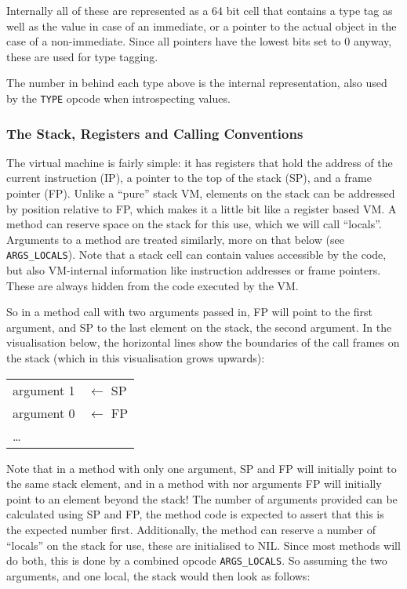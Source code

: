 \documentclass[12pt,a4paper]{article}
\begin{document}

Internally all of these are represented as a 64 bit cell that contains a type tag as well as the value in case of an immediate, or a pointer to the actual object in the case of a non-immediate. Since all pointers have the lowest bits set to 0 anyway, these are used for type tagging.

The number in behind each type above is the internal representation, also used
by the \verb|TYPE| opcode when introspecting values.

\subsubsection{The Stack, Registers and Calling Conventions}\label{sec:stack}

The virtual machine is fairly simple: it has registers that hold the address of the current instruction (IP), a pointer to the top of the stack (SP), and a frame pointer (FP). Unlike a ``pure'' stack VM, elements on the stack can be addressed by position relative to FP, which makes it a little bit like a
register based VM. A method can reserve space on the stack for this use, which we will call ``locals''. Arguments to a method are treated similarly, more on that below (see \verb|ARGS_LOCALS|). Note that a stack cell can contain values accessible by the code, but also VM-internal information like instruction addresses or frame pointers. These are always hidden from the code executed by the VM.

So in a method call with two arguments passed in, FP will point to the first argument, and SP to the last element on the stack, the second argument. In the visualisation below, the horizontal lines show the boundaries of the call frames on the stack (which in this visualisation grows upwards):

\begin{table}[H]
\centering
\begin{tabular}{|p{3cm}|p{3cm}}
argument 1 & $\leftarrow$ SP \\
argument 0 & $\leftarrow$ FP \\
\cline{1-1}
\ldots & \\
\end{tabular}
\end{table}

Note that in a method with only one argument, SP and FP will initially point to the same stack element, and in a method with nor arguments FP will initially point to an element beyond the stack! The number of arguments provided can be calculated using SP and FP, the method code is expected to assert that this is the expected number first. Additionally, the method can reserve a number of ``locals'' on the stack for use, these are initialised to NIL. Since most methods will do both, this is done by a combined opcode \verb|ARGS_LOCALS|. So assuming the two arguments, and one local, the stack would then look as follows:
\end{document}

